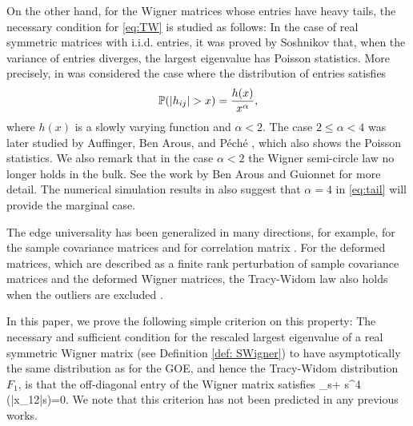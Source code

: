 On the other hand, for the Wigner matrices whose entries have heavy tails, the necessary condition for \eqref{eq:TW} is studied as follows: In the case of real symmetric matrices with i.i.d. entries, it was proved by  Soshnikov  \cite{S2} that, when the variance of entries diverges, the largest eigenvalue has Poisson statistics. More precisely, in \cite{S2} was considered the case where the distribution of entries satisfies
\begin{equation} \label{eq:tail}
\mathbb{P} (|h_{ij}| > x) = \frac{h(x)}{x^{\alpha}},
\end{equation}
where $h(x)$ is a slowly varying function and $\alpha < 2$. The case $2 \leq \alpha < 4$ was later studied by Auffinger, Ben Arous, and P\'ech\'e \cite{ABP}, which also shows the Poisson statistics. We also remark that in the case $\alpha < 2$ the Wigner semi-circle law no longer holds in the bulk. See the work by Ben Arous and Guionnet \cite{BG} for more detail. The numerical simulation results in \cite{BBP} also suggest that $\alpha = 4$ in \eqref{eq:tail} will provide the marginal case. 

The edge universality has been generalized in many directions, for example, for the sample covariance matrices \cite{J1, Jo, So1, S3, PY1} and for correlation matrix \cite{BPZ, PY2}. For the deformed matrices, which are described as a finite rank perturbation of sample covariance matrices and the deformed Wigner matrices, the Tracy-Widom law also holds when the outliers are excluded \cite{BBaP, BV1, BV2, P, KY}.



In this paper, we prove the following simple criterion on this property: The necessary and sufficient condition for the rescaled largest eigenvalue of a real symmetric Wigner matrix (see Definition \ref{def: SWigner}) to have asymptotically the same distribution as for the GOE, and hence the Tracy-Widom distribution $F_1$, is that the off-diagonal entry of the Wigner matrix satisfies
\be \label{crit}
\lim_{s\to +\infty} s^4 \p(|x_{12}|\ge s)=0.
\ee
We note that this criterion has not been predicted in any previous works.

